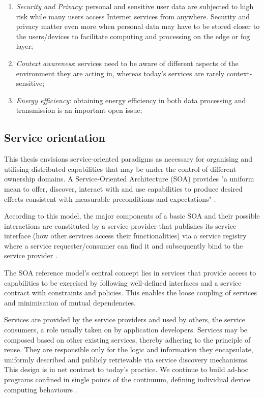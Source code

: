 \begin{enumerate}
    \item \emph{Security and Privacy}: personal and sensitive user data are subjected to high risk while many users access Internet services from anywhere. Security and privacy matter even more when personal data may have to be stored closer to the users/devices to facilitate computing and processing on the edge or fog layer;
    \item \emph{Context awareness}: services need to be aware of different aspects of the environment they are acting in, whereas today's services are rarely context-sensitive;
    \item \emph{Energy efficiency}: obtaining energy efficiency in both data processing and transmission is an important open issue;
\end{enumerate}

\subsection{Service orientation}

This thesis envisions service-oriented paradigms as necessary for organising and utilising distributed capabilities that may be under the control of different ownership domains. A Service-Oriented Architecture (SOA) provides "a uniform mean to offer, discover, interact with and use capabilities to produce desired effects consistent with measurable preconditions and expectations" \cite{oasis}.

According to this model, the major components of a basic SOA and their possible interactions are constituted by a service provider that publishes its service interface (how other services access their functionalities) via a service registry where a service requester/consumer can find it and subsequently bind to the service provider \cite{iot-enterprise}.

The SOA reference model's central concept lies in services that provide access to capabilities to be exercised by following well-defined interfaces and a service contract with constraints and policies. This enables the loose coupling of services and minimisation of mutual dependencies.

Services are provided by the service providers and used by others, the service consumers, a role usually taken on by application developers. Services may be composed based on other existing services, thereby adhering to the principle of reuse. They are responsible only for the logic and information they encapsulate, uniformly described and publicly retrievable via service discovery mechanisms. This design is in net contrast to today's practice. We continue to build ad-hoc programs confined in single points of the continuum, defining individual device computing behaviours \cite{harnessing-continuum}.

